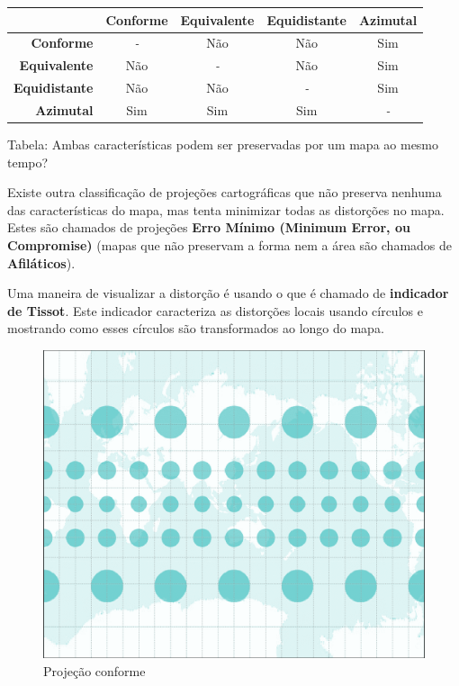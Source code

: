 \documentclass[
]{krantz}
\begin{document}
\begin{longtable}[]{@{}rcccc@{}}
\toprule
& Conforme & Equivalente & Equidistante & Azimutal \\
\midrule
\endhead
\textbf{Conforme} & \emph{-} & Não & Não & Sim \\
\textbf{Equivalente} & Não & \emph{-} & Não & Sim \\
\textbf{Equidistante} & Não & Não & \emph{-} & Sim \\
\textbf{Azimutal} & Sim & Sim & Sim & \emph{-} \\
\bottomrule
\end{longtable}

Tabela: Ambas características podem ser preservadas por um mapa ao mesmo tempo?

Existe outra classificação de projeções cartográficas que não preserva nenhuma das características do mapa, mas tenta minimizar todas as distorções no mapa. Estes são chamados de projeções \textbf{Erro Mínimo (Minimum Error, ou Compromise)} (mapas que não preservam a forma nem a área são chamados de \textbf{Afiláticos}).

Uma maneira de visualizar a distorção é usando o que é chamado de \textbf{indicador de Tissot}. Este indicador caracteriza as distorções locais usando círculos e mostrando como esses círculos são transformados ao longo do mapa.

\begin{figure}
\centering
\includegraphics{media/modulo0/conformal.png}
\caption{Projeção conforme}
\end{figure}
\end{document}
